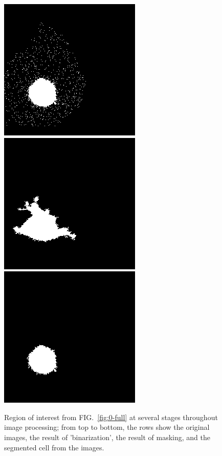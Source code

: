 \documentclass[twocolumn,notitlepage]{revtex4-1}
\begin{document}
\begin{center}
\begin{figure}[h!]
\includegraphics[width=.3\textwidth]{img/2-last.png}\\
\includegraphics[width=.3\textwidth]{img/3-first.png}
\includegraphics[width=.3\textwidth]{img/3-last.png}\\
\caption{\label{fig:0123}Region of interest from FIG.~\ref{fig:0-full} at several stages throughout image processing; from top to bottom, the rows show the original images, the result of 'binarization', the result of masking, and the segmented cell from the images.}
\end{figure}



\end{center}
\end{document}
